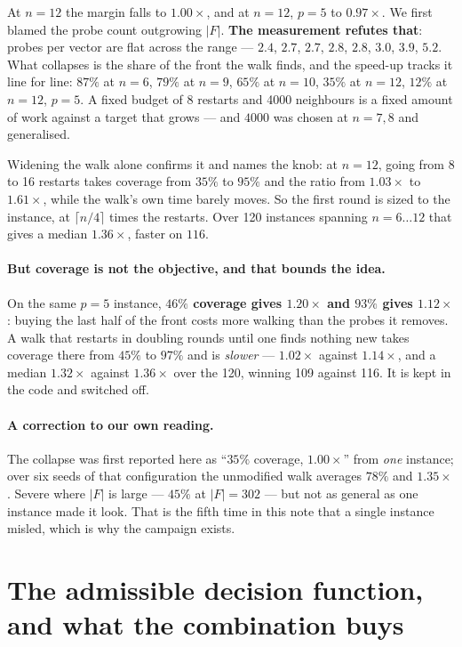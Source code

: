 \documentclass[11pt,a4paper]{article}
\begin{document}
At $n = 12$ the margin falls to $1.00\times$, and at $n=12$, $p=5$ to
$0.97\times$.  We first blamed the probe count outgrowing $|F|$.  \textbf{The
measurement refutes that}: probes per vector are flat across the range ---
$2.4$, $2.7$, $2.7$, $2.8$, $2.8$, $3.0$, $3.9$, $5.2$.  What collapses is the
share of the front the walk finds, and the speed-up tracks it line for line:
$87\%$ at $n=6$, $79\%$ at $n=9$, $65\%$ at $n=10$, $35\%$ at $n=12$, $12\%$ at
$n=12$, $p=5$.  A fixed budget of 8 restarts and 4000 neighbours is a fixed
amount of work against a target that grows --- and $4000$ was chosen at
$n=7,8$ and generalised.

Widening the walk alone confirms it and names the knob: at $n=12$, going from
8 to 16 restarts takes coverage from $35\%$ to $95\%$ and the ratio from
$1.03\times$ to $1.61\times$, while the walk's own time barely moves.  So the
first round is sized to the instance, at $\lceil n/4 \rceil$ times the
restarts.  Over 120 instances spanning $n = 6 \dots 12$ that gives a median
$\mathbf{1.36\times}$, faster on $116$.

\paragraph{But coverage is not the objective, and that bounds the idea.}  On
the same $p = 5$ instance, \textbf{$46\%$ coverage gives $1.20\times$ and
$93\%$ gives $1.12\times$}: buying the last half of the front costs more
walking than the probes it removes.  A walk that restarts in doubling rounds
until one finds nothing new takes coverage there from $45\%$ to $97\%$ and is
\emph{slower} --- $1.02\times$ against $1.14\times$, and a median
$1.32\times$ against $1.36\times$ over the 120, winning 109 against 116.  It
is kept in the code and switched off.

\paragraph{A correction to our own reading.}  The collapse was first reported
here as ``$35\%$ coverage, $1.00\times$'' from \emph{one} instance; over six
seeds of that configuration the unmodified walk averages $78\%$ and
$1.35\times$.  Severe where $|F|$ is large --- $45\%$ at $|F| = 302$ --- but
not as general as one instance made it look.  That is the fifth time in this
note that a single instance misled, which is why the campaign exists.

\section{The admissible decision function, and what the combination buys}
\label{sec:admissible}
\end{document}
